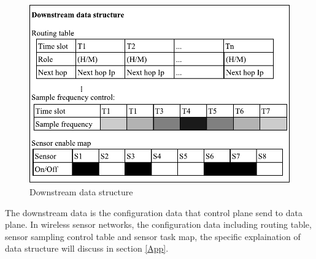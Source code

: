 \begin{figure}[htbp]
	\centering
	\includegraphics[width=.8\columnwidth]{Figure/downstream}
	\caption{Downstream data structure}
	\label{downstream}
\end{figure}

The downstream data is the configuration data that control plane send to data plane. In wireless sensor networks, 
the configuration data including routing table, sensor sampling control table and sensor task map, the specific explaination of data structure will discuss in section \ref{App}.

